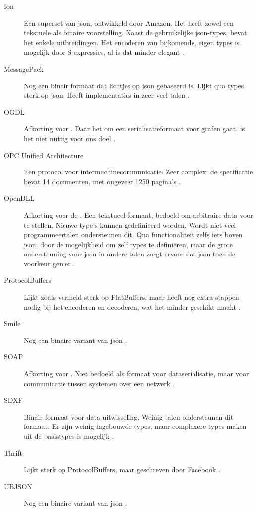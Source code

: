 \begin{description}
    \item[Ion] Een superset van json, ontwikkeld door Amazon.
    Het heeft zowel een tekstuele als binaire voorstelling.
    Naast de gebruikelijke json-types, bevat het enkele uitbreidingen.
    Het encoderen van bijkomende, eigen types is mogelijk door S-expressies, al is dat minder elegant \autocite{ion}.
    \item[MessagePack] Nog een binair formaat dat lichtjes op json gebaseerd is.
    Lijkt qua types sterk op json.
    Heeft implementaties in zeer veel talen \autocite{messagepack}.
    \item[OGDL] Afkorting voor .
    Daar het om een serialisatieformaat voor grafen gaat, is het niet nuttig voor ons doel \autocite{ogdl}.
    \item[OPC Unified Architecture] Een protocol voor intermachinecommunicatie.
    Zeer complex: de specificatie bevat 14 documenten, met ongeveer 1250 pagina's \autocite{tr62541}.
    \item[OpenDLL] Afkorting voor de .
    Een tekstueel formaat, bedoeld om arbitraire data voor te stellen.
    Nieuwe type's kunnen gedefinieerd worden.
    Wordt niet veel programmeertalen ondersteunen dit.
    Qua functionaliteit zelfs iets boven json;
    door de mogelijkheid om zelf types te definiëren, maar de grote ondersteuning voor json in andere talen zorgt ervoor dat json toch de voorkeur geniet \autocite{openddl}.
    \item[ProtocolBuffers] Lijkt zoals vermeld sterk op FlatBuffers, maar heeft nog extra stappen nodig bij het encoderen en decoderen, wat het minder geschikt maakt \autocite{protobuf}.
    \item[Smile] Nog een binaire variant van json \autocite{smile}.
    \item[SOAP] Afkorting voor .
    Niet bedoeld als formaat voor dataserialisatie, maar voor communicatie tussen systemen over een netwerk \autocite{soap}.
    \item[SDXF] Binair formaat voor data-uitwisseling.
    Weinig talen ondersteunen dit formaat.
    Er zijn weinig ingebouwde types, maar complexere types maken uit de basistypes is mogelijk \autocite{rfc3072}.
    \item[Thrift] Lijkt sterk op ProtocolBuffers, maar geschreven door Facebook \autocite{slee2007}.
    \item[UBJSON] Nog een binaire variant van json \autocite{ubjson}.

\end{description}


